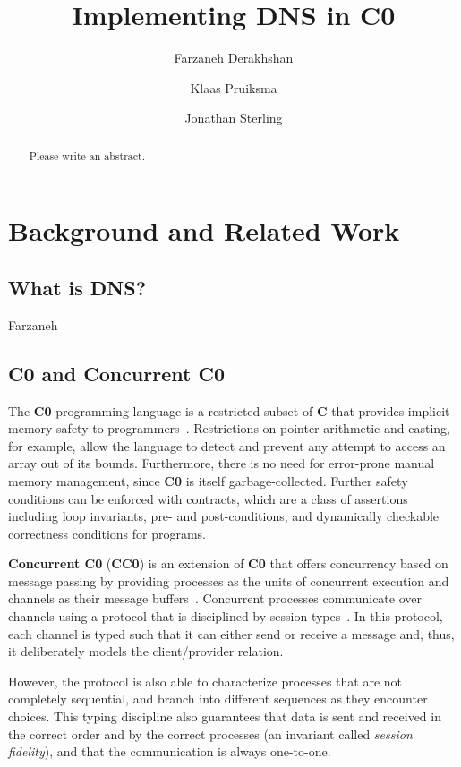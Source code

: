 \documentclass{article}
\title{Implementing DNS in C0}
\author{Farzaneh Derakhshan \and Klaas Pruiksma \and Jonathan Sterling}
\newcommand\Kwd[1]{{\sffamily\bfseries{#1}}}
\begin{document}
\maketitle

\begin{abstract}
  Please write an abstract.
\end{abstract}

\section{Background and Related Work}

\subsection{What is DNS?}

Farzaneh

\subsection{C0 and Concurrent C0}\label{sec:c0}

The \Kwd{C0} programming language is a restricted subset of \Kwd{C}
that provides implicit memory safety to
programmers~\cite{pfenning:c0-reference}. Restrictions on pointer
arithmetic and casting, for example, allow the language to detect and
prevent any attempt to access an array out of its bounds. Furthermore,
there is no need for error-prone manual memory management, since
\Kwd{C0} is itself garbage-collected. Further safety conditions can be
enforced with contracts, which are a class of assertions including
loop invariants, pre- and post-conditions, and dynamically checkable
correctness conditions for programs.

\Kwd{Concurrent C0} (\Kwd{CC0}) is an extension of \Kwd{C0} that
offers concurrency based on message passing by providing processes as
the units of concurrent execution and channels as their message
buffers~\cite{willsey-prabhu-pfenning:2016}. Concurrent processes
communicate over channels using a protocol that is disciplined by
session types~\cite{caires-pfenning-toninho:2013,
  balzer-pfenning:2017}. In this protocol, each channel is typed such
that it can either send or receive a message and, thus, it
deliberately models the client/provider relation.

However, the protocol is also able to characterize processes that are
not completely sequential, and branch into different sequences as they
encounter choices. This typing discipline also guarantees that data is
sent and received in the correct order and by the correct processes
(an invariant called \emph{session fidelity}), and that the
communication is always one-to-one.
\end{document}
